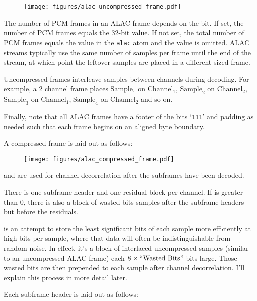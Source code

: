 \begin{figure}[h]
\texttt{[image: figures/alac\_uncompressed\_frame.pdf]}
\end{figure}
\par
\noindent
The number of PCM frames in an ALAC frame depends on the 
bit.
If set, the number of PCM frames equals the 32-bit 
value.
If not set, the total number of PCM frames equals the 
value in the \texttt{alac} atom and the  value is omitted.
ALAC streams typically use the same number of samples per frame
until the end of the stream, at which point the leftover samples
are placed in a different-sized frame.

Uncompressed frames interleave samples between channels during decoding.
For example, a 2 channel frame places $\text{Sample}_1$ on $\text{Channel}_1$,
$\text{Sample}_2$ on $\text{Channel}_2$,
$\text{Sample}_3$ on $\text{Channel}_1$,
$\text{Sample}_4$ on $\text{Channel}_2$ and so on.

Finally, note that all ALAC frames have a footer of the bits `\texttt{111}'
and padding as needed such that each frame begins on an aligned byte boundary.

\pagebreak

A compressed frame is laid out as follows:

\begin{figure}[h]
\texttt{[image: figures/alac\_compressed\_frame.pdf]}
\end{figure}
\par
\noindent
{} and  are used
for channel decorrelation after the subframes have been decoded.

There is one subframe header and one residual block per
channel.
If  is greater than 0, there is also
a block of wasted bits samples after the subframe headers but before
the residuals.

\label{alac_wasted_bits}
 is an attempt to store the least significant bits
of each sample more efficiently at high bits-per-sample, where
that data will often be indistinguishable from random noise.
In effect, it's a block of interlaced uncompressed samples
(similar to an uncompressed ALAC frame) each $8 \times \text{``{Wasted Bits}''}$
bits large.
Those wasted bits are then prepended to each sample after channel
decorrelation.
I'll explain this process in more detail later.

Each subframe header is laid out as follows:

